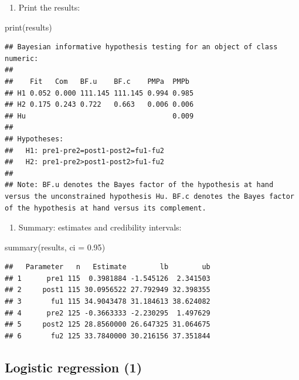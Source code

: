 \documentclass[
]{book}
\newenvironment{Shaded}{\begin{snugshade}}{\end{snugshade}}
\newcommand{\AttributeTok}[1]{\textcolor[rgb]{0.77,0.63,0.00}{#1}}
\newcommand{\FloatTok}[1]{\textcolor[rgb]{0.00,0.00,0.81}{#1}}
\newcommand{\FunctionTok}[1]{\textcolor[rgb]{0.00,0.00,0.00}{#1}}
\newcommand{\NormalTok}[1]{#1}
\providecommand{\tightlist}{%
  \setlength{\itemsep}{0pt}\setlength{\parskip}{0pt}}
\begin{document}
\begin{enumerate}
\def\labelenumi{\arabic{enumi})}
\setcounter{enumi}{4}
\tightlist
\item
  Print the results:
\end{enumerate}

\begin{Shaded}
\begin{Highlighting}[]
\FunctionTok{print}\NormalTok{(results)}
\end{Highlighting}
\end{Shaded}

\begin{verbatim}
## Bayesian informative hypothesis testing for an object of class numeric:
## 
##    Fit   Com   BF.u    BF.c    PMPa  PMPb 
## H1 0.052 0.000 111.145 111.145 0.994 0.985
## H2 0.175 0.243 0.722   0.663   0.006 0.006
## Hu                                   0.009
## 
## Hypotheses:
##   H1: pre1-pre2=post1-post2=fu1-fu2
##   H2: pre1-pre2>post1-post2>fu1-fu2
## 
## Note: BF.u denotes the Bayes factor of the hypothesis at hand versus the unconstrained hypothesis Hu. BF.c denotes the Bayes factor of the hypothesis at hand versus its complement.
\end{verbatim}

\begin{enumerate}
\def\labelenumi{\arabic{enumi})}
\setcounter{enumi}{5}
\tightlist
\item
  Summary: estimates and credibility intervals:
\end{enumerate}

\begin{Shaded}
\begin{Highlighting}[]
\FunctionTok{summary}\NormalTok{(results, }\AttributeTok{ci =} \FloatTok{0.95}\NormalTok{)}
\end{Highlighting}
\end{Shaded}

\begin{verbatim}
##   Parameter   n   Estimate        lb        ub
## 1      pre1 115  0.3981884 -1.545126  2.341503
## 2     post1 115 30.0956522 27.792949 32.398355
## 3       fu1 115 34.9043478 31.184613 38.624082
## 4      pre2 125 -0.3663333 -2.230295  1.497629
## 5     post2 125 28.8560000 26.647325 31.064675
## 6       fu2 125 33.7840000 30.216156 37.351844
\end{verbatim}

\hypertarget{logistic-regression-1}{%
\subsection{Logistic regression (1)}\label{logistic-regression-1}}
\end{document}
